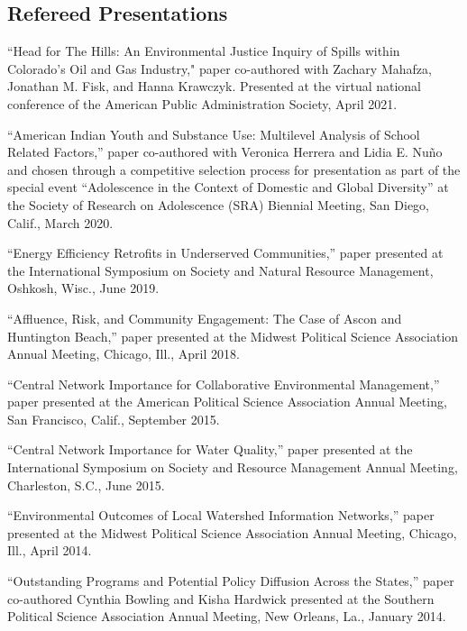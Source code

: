 \documentclass[11pt,letterpaper]{article}
\renewenvironment{itemize}{
  \begin{list}{}{
    \setlength{\leftmargin}{1.5em}
    \setlength{\itemsep}{0.25em}
    \setlength{\parskip}{0pt}
    \setlength{\parsep}{0.25em}
  }
}{
  \end{list}
}
\begin{document}
\subsection*{Refereed Presentations}
	\begin{itemize}\leftmargin=2pt\itemindent=-15pt
		
		\item ``Head for The Hills: An Environmental Justice Inquiry of Spills within Colorado's Oil and Gas Industry," paper co-authored with Zachary Mahafza, Jonathan M. Fisk, and Hanna Krawczyk. Presented at the virtual national conference of the American Public Administration Society, April 2021. 
		
		\item ``American Indian Youth and Substance Use: Multilevel Analysis of School Related Factors,'' paper co-authored with Veronica Herrera and Lidia E. Nu\~no and chosen through a competitive selection process for presentation as part of the special event ``Adolescence in the Context of Domestic and Global Diversity'' at the Society of Research on Adolescence (SRA) Biennial Meeting, San Diego, Calif., March 2020. 
		
		\item ``Energy Efficiency Retrofits in Underserved Communities,'' paper presented at the International Symposium on Society and Natural Resource Management, Oshkosh, Wisc., June 2019.
		
		\item ``Affluence, Risk, and Community Engagement: The Case of Ascon and Huntington Beach,'' paper presented at the Midwest Political Science Association Annual Meeting, Chicago, Ill., April 2018.
		
		\item ``Central Network Importance for Collaborative Environmental Management,'' paper presented at the American Political Science Association Annual Meeting, San Francisco, Calif., September 2015.
		
		\item ``Central Network Importance for Water Quality,'' paper presented at the International Symposium on Society and Resource Management Annual Meeting, Charleston, S.C., June 2015.
		
		\item ``Environmental Outcomes of Local Watershed Information Networks,'' paper presented at the Midwest Political Science Association Annual Meeting, Chicago, Ill., April 2014.
		
		\item ``Outstanding Programs and Potential Policy Diffusion Across the States,'' paper co-authored Cynthia Bowling and Kisha Hardwick presented at the Southern Political Science Association Annual Meeting, New Orleans, La., January 2014. 
		

\end{itemize}
\end{document}
